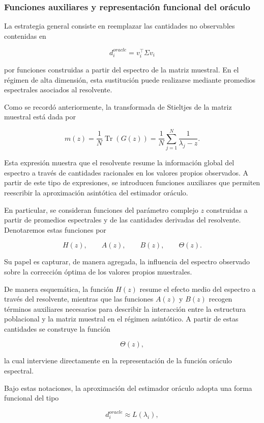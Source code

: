 \documentclass[letterpaper,12pt,oneside]{book}
\begin{document}
\subsubsection*{Funciones auxiliares y representación funcional del oráculo}

La estrategia general consiste en reemplazar las cantidades no observables contenidas en

\[
d_i^{oracle}=v_i^\top \Sigma v_i
\]

por funciones construidas a partir del espectro de la matriz muestral. En el régimen de alta dimensión, esta sustitución puede realizarse mediante promedios espectrales asociados al resolvente.

Como se recordó anteriormente, la transformada de Stieltjes de la matriz muestral está dada por

\[
m(z)=\frac{1}{N}\operatorname{Tr}(G(z))
=
\frac{1}{N}\sum_{j=1}^{N}\frac{1}{\lambda_j-z}.
\]

Esta expresión muestra que el resolvente resume la información global del espectro a través de cantidades racionales en los valores propios observados. A partir de este tipo de expresiones, se introducen funciones auxiliares que permiten reescribir la aproximación asintótica del estimador oráculo.

En particular, se consideran funciones del parámetro complejo $z$ construidas a partir de promedios espectrales y de las cantidades derivadas del resolvente. Denotaremos estas funciones por

\[
H(z),\qquad A(z),\qquad B(z),\qquad \Theta(z).
\]

Su papel es capturar, de manera agregada, la influencia del espectro observado sobre la corrección óptima de los valores propios muestrales.

De manera esquemática, la función $H(z)$ resume el efecto medio del espectro a través del resolvente, mientras que las funciones $A(z)$ y $B(z)$ recogen términos auxiliares necesarios para describir la interacción entre la estructura poblacional y la matriz muestral en el régimen asintótico. A partir de estas cantidades se construye la función

\[
\Theta(z),
\]

la cual interviene directamente en la representación de la función oráculo espectral.

Bajo estas notaciones, la aproximación del estimador oráculo adopta una forma funcional del tipo

\[
d_i^{oracle}\approx L(\lambda_i),
\]
\end{document}
